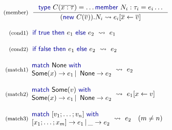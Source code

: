 \documentclass[10pt,preprint,clearpagebib]{sigplanconf}
\newcommand{\kvd}[1]{\textnormal{\textcolor{kvdclr}{\sffamily #1}}}
\newcommand{\ident}[1]{\textnormal{\sffamily #1}}
\newcommand{\reduce}{\rightsquigarrow}
\begin{document}
\begin{figure}
\begin{equation*}
\begin{array}{rl}
 \textnormal{\footnotesize{(member)}}&
 \hspace{-0.4em}
 \inference
 { \kvd{type}~C(\overline{x:\tau})=\ldots \kvd{member}~N_i : \tau_i = e_i \ldots }
 { (\kvd{new}~C(\overline{v})).N_i \reduce e_i[\overline{x} \leftarrow \overline{v}] }\\
 \\
 \textnormal{\footnotesize{(cond1)}}&
 \hspace{-0.4em}
 \kvd{if}~\kvd{true}~\kvd{then}~e_1~\kvd{else}~e_2 ~\reduce~ e_1 \\
 \\
 \textnormal{\footnotesize{(cond2)}}&
 \hspace{-0.4em}
 \kvd{if}~\kvd{false}~\kvd{then}~e_1~\kvd{else}~e_2 ~\reduce~ e_2 \\
 \\
 \textnormal{\footnotesize{(match1)}}&
 \hspace{-1em}
 \begin{array}{l}
  \kvd{match}~\ident{None}~\kvd{with} \\
  \ident{Some}(x) \rightarrow e_1 \,|\, \ident{None} \rightarrow e_2
 \end{array} \hspace{-0.5em} ~\reduce~ e_2 \\
 \\
 \textnormal{\footnotesize{(match2)}}&
 \hspace{-1em}
 \begin{array}{l}
    \kvd{match}~\ident{Some}(v)~\kvd{with} \\
    \ident{Some}(x) \rightarrow e_1 \,|\, \ident{None} \rightarrow e_2
 \end{array} \hspace{-0.5em} ~\reduce~ e_1[x\leftarrow v]\\
 \\
 \textnormal{\footnotesize{(match3)}}&
 \hspace{-1em}
 \begin{array}{l}
  \kvd{match}~[v_1;\ldots;v_n]~\kvd{with} \\[0em]
  [x_1;\ldots;x_m ] \rightarrow e_1 \,|\, \_ \rightarrow e_2
 \end{array} \hspace{-0.5em} ~\reduce~ e_2\quad(m\neq n) \\
 \\

\end{array}
\end{equation*}
\end{figure}
\end{document}
